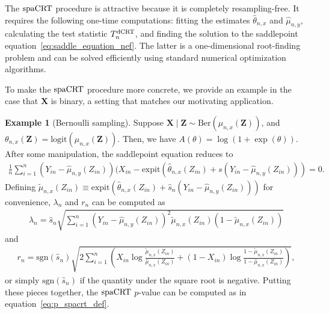 \documentclass[12pt]{article}
\theoremstyle{definition}
\newtheorem{example}{Example}
\newcommand{\prx}{\bm X}								%
\newcommand{\srx}{X}									%
\newcommand{\prz}{\bm Z}								%
\newcommand{\srz}{Z}									%
\newcommand{\sry}{Y}									%
\newcommand{\dCRT}{\textnormal{dCRT}} 					%
\newcommand{\spacrt}{\textnormal{spaCRT}}               %
\begin{document}
The $\spacrt$ procedure is attractive because it is completely resampling-free. It requires the following one-time computations: fitting the estimates $\widehat \theta_{n,x}$ and $\widehat \mu_{n,y}$, calculating the test statistic $T_n^\dCRT$, and finding the solution to the saddlepoint equation~\eqref{eq:saddle_equation_nef}. The latter is a one-dimensional root-finding problem and can be solved efficiently using standard numerical optimization algorithms. 

To make the $\spacrt$ procedure more concrete, we provide an example in the case that $\prx$ is binary, a setting that matches our motivating application.

\begin{example}[Bernoulli sampling]
  Suppose $\prx\mid\prz\sim \mathrm{Ber}(\mu_{n,x}(\prz))$, and $\theta_{n,x}(\prz) = \text{logit}(\mu_{n,x}(\prz))$. Then, we have $A(\theta) = \log(1 + \exp(\theta))$. After some manipulation, the saddlepoint equation reduces to 
	\begin{align*}
		\frac{1}{n}\sum_{i=1}^n (\sry_{in}-\widehat{\mu}_{n,y}(\srz_{in}))(\srx_{in}-\text{expit}(\widehat \theta_{n,x}(\srz_{in})+s(\sry_{in}-\widehat{\mu}_{n,y}(\srz_{in})))=0.
	\end{align*}
	Defining $\widetilde \mu_{n,x}(Z_{in}) \equiv \text{expit}(\widehat \theta_{n,x}(\srz_{in})+\hat s_n(\sry_{in}-\widehat{\mu}_{n,y}(\srz_{in})))$ for convenience, $\lambda_n$ and $r_n$ can be computed as 
	\begin{align*}
		\lambda_n=\hat s_n \sqrt{\sum_{i=1}^n (\sry_{in}-\widehat{\mu}_{n,y}(\srz_{in}))^2\widetilde \mu_{n,x}(Z_{in})(1-\widetilde \mu_{n,x}(Z_{in}))}
	\end{align*}
	and
	\begin{align*}
		r_n=\mathrm{sgn}(\hat s_n)\sqrt{2\sum_{i=1}^n \left(X_{in} \log \frac{\widetilde \mu_{n,x}(Z_{in})}{\widehat \mu_{n,x}(Z_{in})} + (1 - X_{in})\log \frac{1 - \widetilde \mu_{n,x}(Z_{in})}{1 - \widehat \mu_{n,x}(Z_{in})}\right)},
	\end{align*}
  or simply $\text{sgn}(\hat s_n)$ if the quantity under the square root is negative. Putting these pieces together, the $\spacrt$ $p$-value can be computed as in equation~\eqref{eq:p_spacrt_def}.	
\end{example}






\end{document}
